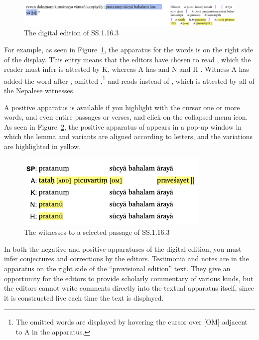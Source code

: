 \begin{figure}[h]
    \centering
    \includegraphics[draft=false, width=\textwidth]{media/SS.1.16.3b}
    \caption{The digital edition of SS.1.16.3}
    \label{SS.1.16}
\end{figure}
For example, as seen in Figure~\ref{SS.1.16}, the apparatus for the words 
 is on the right side of the display. 
This entry means that the editors have chosen to read 
, which the reader must infer is attested by K, whereas A has 
 and N and H . Witness A has added the word  after , omitted ,\footnote{The omitted words are displayed by hovering the cursor over [OM] adjacent to A in the apparatus.} and reads  instead of , which is attested by all of the Nepalese witnesses. 

A positive apparatus is available if you highlight with the cursor one or more
words, and even entire passages or verses, and click on the collapsed menu icon.
As seen in Figure~\ref{SS.1.16.3}, the positive apparatus of
 appears in a pop-up window in which the lemma and
variants are aligned according to letters, and the variations are highlighted in
yellow.

\begin{figure}[h]
    \centering
    \includegraphics[draft=false,width=\textwidth]{media/SS.1.16b.positive}
    \caption{The witnesses to a selected passage of SS.1.16.3}
    \label{SS.1.16.3}
\end{figure}

In both the negative and positive apparatuses of the digital edition, you must
infer conjectures and corrections by the editors. Testimonia and notes are in the
apparatus on the right side of the “provisional edition” text.  They give an
opportunity for the editors to provide scholarly commentary of various kinds, but
the editors cannot write comments directly into the textual apparatus itself,
since it is constructed live each time the text is displayed.





